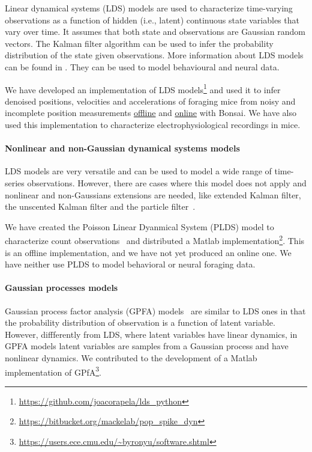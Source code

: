 Linear dynamical systems (LDS) models are used to characterize time-varying
observations as a function of hidden (i.e., latent) continuous state variables
that vary over time. It assumes that both state and observations are Gaussian
random vectors. The Kalman filter algorithm can be used to infer the
probability distribution of the state given observations. More information
about LDS models can be found in \citep[][part I]{durbinAndKoopman12}. They can
be used to model behavioural and neural data.

We have developed an implementation of LDS
models\footnote{\url{https://github.com/joacorapela/lds\_python}} and used it to infer denoised
positions, velocities and accelerations of foraging mice from noisy and
incomplete position measurements
\href{https://joacorapela.github.io/lds\_python/auto\_examples/tracking/plotFilterFWGMouseTrajectoryManualVsLearnedParams.html}{offline}
and
\href{https://bonsai-rx.org/machinelearning/examples/examples/LinearDynamicalSystems/Kinematics/ForagingMouse/README.html}{online}
with Bonsai.
%
We have also used this implementation to characterize electrophysiological recordings in mice.

\paragraph{Nonlinear and non-Gaussian dynamical systems models}

LDS models are very versatile and can be used to model a wide range of
time-series observations. However, there are cases where this model does not
apply and nonlinear and non-Gaussians extensions are needed, like extended
Kalman filter, the unscented Kalman filter and the particle
filter~\citep[][part II]{durbinAndKoopman12}.

We have created the Poisson Linear Dyanmical System (PLDS) model to characterize count
observations~\citep{mackeEtAl15} and distributed a Matlab
implementation\footnote{\url{https://bitbucket.org/mackelab/pop\_spike\_dyn}}.
This is an offline implementation, and we have not yet produced an online one.
We have neither use PLDS to model behavioral or neural foraging data.

\paragraph{Gaussian processes models}

Gaussian process factor analysis (GPFA) models~\citep{yuEtAl09} are similar to
LDS ones in that the probability distribution of observation is a function of
latent variable. However, diffferently from LDS, where latent variables have
linear dynamics, in GPFA models latent variables are samples from a Gaussian
process and have nonlinear dynamics. We contributed to the development of a
Matlab implementation of
GPfA\footnote{\url{https://users.ece.cmu.edu/~byronyu/software.shtml}}.

